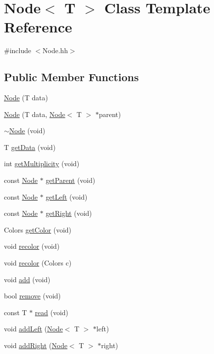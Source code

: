 \hypertarget{class_node}{}\section{Node$<$ T $>$ Class Template Reference}
\label{class_node}


{\ttfamily \#include $<$Node.\+hh$>$}

\subsection*{Public Member Functions}
\begin{DoxyCompactItemize}
\item 
\hyperlink{class_node_a0692b16d246460bf94c18d49592facdd}{Node} (T data)
\item 
\hyperlink{class_node_a7349325d564e6c20f471aaa013d00b59}{Node} (T data, \hyperlink{class_node}{Node}$<$ T $>$ $\ast$parent)
\item 
\hyperlink{class_node_a5fc413278a0bd22eb84e03c0ae90e22a}{$\sim$\+Node} (void)
\item 
T \hyperlink{class_node_ad89031c2899fe91646652ce4c2e79ab6}{get\+Data} (void)
\item 
int \hyperlink{class_node_ab83eb1cc81f91a5641693eb22712f8c8}{get\+Multiplicity} (void)
\item 
const \hyperlink{class_node}{Node} $\ast$ \hyperlink{class_node_a6a6c7c5376ee83e972ef5455b45143d5}{get\+Parent} (void)
\item 
const \hyperlink{class_node}{Node} $\ast$ \hyperlink{class_node_ac7fe9e26d77f45acdbf919adca86e843}{get\+Left} (void)
\item 
const \hyperlink{class_node}{Node} $\ast$ \hyperlink{class_node_a8dcc0a75395710d8c887d52daf72f2c8}{get\+Right} (void)
\item 
Colors \hyperlink{class_node_a9c209bbcd6a8c1e07914a0c6bea3a6f4}{get\+Color} (void)
\item 
void \hyperlink{class_node_a431de433a18f187a322ff5fe3ce39c9c}{recolor} (void)
\item 
void \hyperlink{class_node_a28b5a3622c4379faa722995c1ba01ae4}{recolor} (Colors c)
\item 
void \hyperlink{class_node_aef85f7c8d30881449f35ac5fda836438}{add} (void)
\item 
bool \hyperlink{class_node_a2f77a48dceae8b8268826483f9671e1a}{remove} (void)
\item 
const T $\ast$ \hyperlink{class_node_a565b1a8bbc88c67b5dbc6a78a11a4ba2}{read} (void)
\item 
void \hyperlink{class_node_a78c42d0d8acc20440279aa851c02b38e}{add\+Left} (\hyperlink{class_node}{Node}$<$ T $>$ $\ast$left)
\item 
void \hyperlink{class_node_ae0a74454b02ab98b6c373dea65ac441e}{add\+Right} (\hyperlink{class_node}{Node}$<$ T $>$ $\ast$right)
\end{DoxyCompactItemize}



